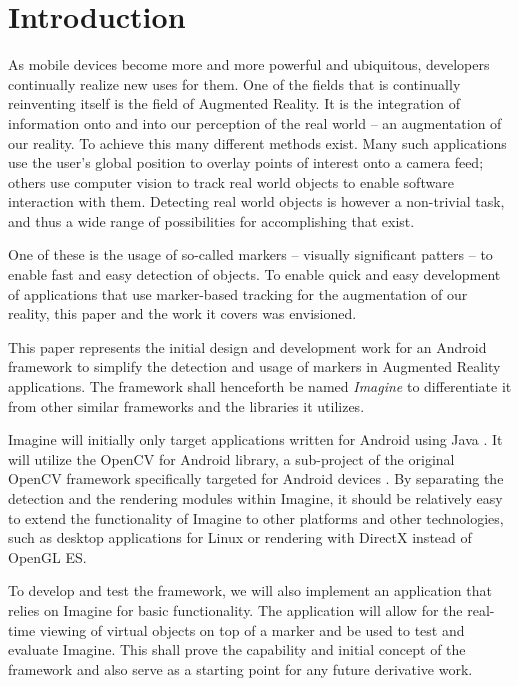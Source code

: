 \section{Introduction}

As mobile devices become more and more powerful and ubiquitous, developers continually realize new uses for them.
One of the fields that is continually reinventing itself is the field of Augmented Reality.
It is the integration of information onto and into our perception of the real world – an augmentation of our reality.
To achieve this many different methods exist\cite{sabrina972}.
Many such applications use the user's global position to overlay points of interest onto a camera feed; others use computer vision to track real world objects to enable software interaction with them.
Detecting real world objects is however a non-trivial task, and thus a wide range of possibilities for accomplishing that exist.

One of these is the usage of so-called markers – visually significant patters – to enable fast and easy detection of objects.
To enable quick and easy development of applications that use marker-based tracking for the augmentation of our reality, this paper and the work it covers was envisioned.

This paper represents the initial design and development work for an Android framework to simplify the detection and usage of markers in Augmented Reality applications.
The framework shall henceforth be named \textit{Imagine} to differentiate it from other similar frameworks and the libraries it utilizes.

Imagine will initially only target applications written for Android using Java \cite{android}.
It will utilize the OpenCV for Android library, a sub-project of the original OpenCV framework specifically targeted for Android devices \cite{opencvandroid}.
By separating the detection and the rendering modules within Imagine, it should be relatively easy to extend the functionality of Imagine to other platforms and other technologies, such as desktop applications for Linux or rendering with DirectX instead of OpenGL ES.

To develop and test the framework, we will also implement an application that relies on Imagine for basic functionality.
The application will allow for the real-time viewing of virtual objects on top of a marker and be used to test and evaluate Imagine.
This shall prove the capability and initial concept of the framework and also serve as a starting point for any future derivative work.

